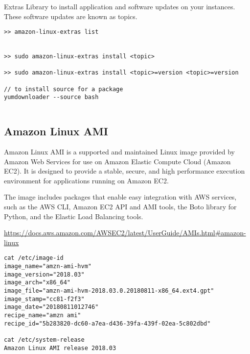 Extras Library to install application and software updates on your instances.
These software updates are known as topics.
 
\begin{verbatim}
>> amazon-linux-extras list


>> sudo amazon-linux-extras install <topic>

>> sudo amazon-linux-extras install <topic>=version <topic>=version

// to install source for a package
yumdownloader --source bash


\end{verbatim}

\subsection{Amazon Linux AMI}

Amazon Linux AMI is a supported and maintained Linux image provided by Amazon
Web Services for use on Amazon Elastic Compute Cloud (Amazon EC2). It is
designed to provide a stable, secure, and high performance execution environment
for applications running on Amazon EC2.


The image includes packages that enable easy integration with AWS services, such
as the AWS CLI, Amazon EC2 API and AMI tools, the Boto library for Python, and
the Elastic Load Balancing tools.

\url{https://docs.aws.amazon.com/AWSEC2/latest/UserGuide/AMIs.html#amazon-linux}


\begin{verbatim}
cat /etc/image-id
image_name="amzn-ami-hvm"
image_version="2018.03"
image_arch="x86_64"
image_file="amzn-ami-hvm-2018.03.0.20180811-x86_64.ext4.gpt"
image_stamp="cc81-f2f3"
image_date="20180811012746"
recipe_name="amzn ami"
recipe_id="5b283820-dc60-a7ea-d436-39fa-439f-02ea-5c802dbd"

cat /etc/system-release
Amazon Linux AMI release 2018.03
\end{verbatim}